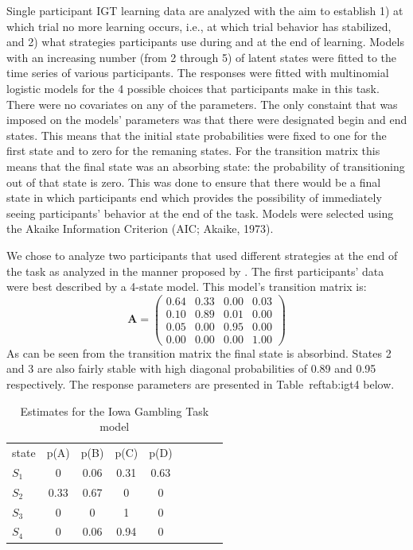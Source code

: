 \documentclass[a4paper,12pt,man]{apa} %
\newcommand{\citet}{\citeA}
\newcommand{\mat}{\mathbf}
\begin{document}
Single participant IGT learning data are analyzed with the aim to
establish 1) at which trial no more learning occurs, i.e., at which
trial behavior has stabilized, and 2) what strategies participants use
during and at the end of learning.  Models with an increasing number
(from 2 through 5) of latent states were fitted to the time series of
various participants.  The responses were fitted with multinomial
logistic models for the 4 possible choices that participants make in
this task.  There were no covariates on any of the parameters.  The
only constaint that was imposed on the models' parameters was that
there were designated begin and end states.  This means that the
initial state probabilities were fixed to one for the first state and
to zero for the remaning states.  For the transition matrix this means
that the final state was an absorbing state: the probability of
transitioning out of that state is zero.  This was done to ensure that
there would be a final state in which participants end which provides
the possibility of immediately seeing participants' behavior at the
end of the task.  Models were selected using the Akaike Information
Criterion (AIC; Akaike, 1973).

\nocite{Akaike1973} %

We chose to analyze two participants that used different strategies at
the end of the task as analyzed in the manner proposed by
\citet{Huizenga2007}.  The first participants' data were best
described by a 4-state model.  This model's transition matrix is:
$$
\mat{A} = \begin{pmatrix} 
				0.64 & 0.33 & 0.00 & 0.03 \\
				0.10 & 0.89 & 0.01 & 0.00 \\
				0.05 & 0.00 & 0.95 & 0.00 \\
				0.00 & 0.00 & 0.00 & 1.00
		  \end{pmatrix}
$$
As can be seen from the transition matrix the final state is
absorbind.  States 2 and 3 are also fairly stable with high diagonal
probabilities of 0.89 and 0.95 respectively.  The response parameters
are presented in Table~ref{tab:igt4} below.

\begin{table}
	\caption{Estimates for the Iowa Gambling Task model}
	\label{tab:igt4}
	\begin{tabular}{lcccccccc} \hline
		state & p(A) & p(B) & p(C) & p(D) \\
		$S_1$ & 0    & 0.06 & 0.31 & 0.63 \\
		$S_2$ & 0.33 & 0.67 & 0    & 0 \\ 
		$S_3$ & 0    & 0    & 1    & 0 \\
		$S_4$ & 0    & 0.06 & 0.94 & 0 
	\end{tabular}
\end{table}
\end{document}
